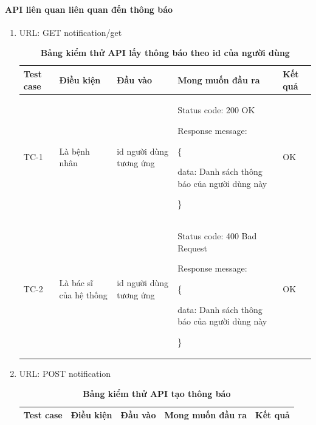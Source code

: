 \paragraph{API liên quan liên quan đến thông báo}
\mbox{}
\begin{enumerate}
	\item URL: GET notification/get
	      \begin{xltabular}{\textwidth}{
		      | >{\raggedright\arraybackslash}p{1cm}
		      | >{\raggedright\arraybackslash}p{2.5cm}
		      | >{\raggedright\arraybackslash}X
		      | >{\raggedright\arraybackslash}X
		      | >{\raggedright\arraybackslash}p{1cm}|
		      }
		      \caption{\bfseries \fontsize{12pt}{0pt}\selectfont Bảng kiểm thử API lấy thông báo theo id của người dùng}
		      \\
		      \hline
		      \bfseries Test case    &\bfseries Điều kiện   &\bfseries Đầu vào
		      &\bfseries Mong muốn đầu ra &\bfseries Kết quả\\ \hline


		      TC-1
		      & Là bệnh nhân
		      & id người dùng tương ứng
		      &

		      Status code: 200 OK

		      Response message:

		      \{

		      data: Danh sách thông báo của người dùng này

		      \}

		      & OK

		      \\ \hline

		      TC-2
		      & Là bác sĩ của hệ thống
		      & id người dùng tương ứng
		      &

		      Status code: 400 Bad Request

		      Response message:

		      \{

		      data: Danh sách thông báo của người dùng này

		      \}

		      & OK

		      \\ \hline

	      \end{xltabular}

	\item URL: POST notification
	      \begin{xltabular}{\textwidth}{
		      | >{\raggedright\arraybackslash}p{1cm}
		      | >{\raggedright\arraybackslash}p{2.5cm}
		      | >{\raggedright\arraybackslash}X
		      | >{\raggedright\arraybackslash}X
		      | >{\raggedright\arraybackslash}p{1cm}|
		      }
		      \caption{\bfseries \fontsize{12pt}{0pt}\selectfont Bảng kiểm thử API tạo thông báo}
		      \\
		      \hline
		      \bfseries Test case    &\bfseries Điều kiện   &\bfseries Đầu vào
		      &\bfseries Mong muốn đầu ra &\bfseries Kết quả\\ \hline



\end{xltabular}
\end{enumerate}
